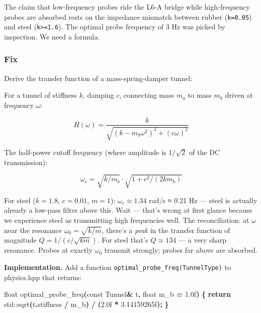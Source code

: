 \documentclass[
  11pt,
  a4paper,
]{article}
\newenvironment{Shaded}{\begin{snugshade}}{\end{snugshade}}
\newcommand{\AttributeTok}[1]{\textcolor[rgb]{0.13,0.29,0.53}{#1}}
\newcommand{\BuiltInTok}[1]{#1}
\newcommand{\ControlFlowTok}[1]{\textcolor[rgb]{0.13,0.29,0.53}{\textbf{#1}}}
\newcommand{\DataTypeTok}[1]{\textcolor[rgb]{0.13,0.29,0.53}{#1}}
\newcommand{\FloatTok}[1]{\textcolor[rgb]{0.00,0.00,0.81}{#1}}
\newcommand{\NormalTok}[1]{#1}
\newcommand{\OperatorTok}[1]{\textcolor[rgb]{0.81,0.36,0.00}{\textbf{#1}}}
\newcommand{\VariableTok}[1]{\textcolor[rgb]{0.00,0.00,0.00}{#1}}
\begin{document}
The claim that low-frequency probes ride the L6-A bridge while
high-frequency probes are absorbed rests on the impedance mismatch
between rubber (\texttt{k=0.05}) and steel
(\texttt{k\textgreater{}=1.6}). The optimal probe frequency of 3 Hz was
picked by inspection. We need a formula.

\subsubsection{Fix}\label{fix-4}

Derive the transfer function of a mass-spring-damper tunnel:

For a tunnel of stiffness \(k\), damping \(c\), connecting mass \(m_a\)
to mass \(m_b\) driven at frequency \(\omega\):

\[
H(\omega) = \frac{k}{\sqrt{(k - m_b \omega^2)^2 + (c\omega)^2}}
\]

The half-power cutoff frequency (where amplitude is \(1/\sqrt{2}\) of
the DC transmission):

\[
\omega_c = \sqrt{k/m_b} \cdot \sqrt{1 + c^2/(2 k m_b)}
\]

For steel (\(k=1.8\), \(c=0.01\), \(m=1\)): \(\omega_c \approx 1.34\)
rad/s ≈ 0.21 Hz --- steel is actually already a low-pass filter above
this. Wait --- that's wrong at first glance because we experience steel
as transmitting high frequencies well. The reconciliation: at \(\omega\)
near the resonance \(\omega_0 = \sqrt{k/m}\), there's a \emph{peak} in
the transfer function of magnitude \(Q = 1/(c/\sqrt{k m})\). For steel
that's \(Q \approx 134\) --- a very sharp resonance. Probes at exactly
\(\omega_0\) transmit strongly; probes far above are absorbed.

\textbf{Implementation.} Add a function
\texttt{optimal\_probe\_freq(TunnelType)} to physics.hpp that returns:

\begin{Shaded}
\begin{Highlighting}[]
\DataTypeTok{float}\NormalTok{ optimal\_probe\_freq}\OperatorTok{(}\AttributeTok{const}\NormalTok{ Tunnel}\OperatorTok{\&}\NormalTok{ t}\OperatorTok{,} \DataTypeTok{float} \VariableTok{m\_b} \OperatorTok{=} \FloatTok{1.0}\BuiltInTok{f}\OperatorTok{)} \OperatorTok{\{}
    \ControlFlowTok{return} \BuiltInTok{std::}\NormalTok{sqrt}\OperatorTok{(}\NormalTok{t}\OperatorTok{.}\NormalTok{stiffness }\OperatorTok{/} \VariableTok{m\_b}\OperatorTok{)} \OperatorTok{/} \OperatorTok{(}\FloatTok{2.0}\BuiltInTok{f} \OperatorTok{*} \FloatTok{3.14159265}\BuiltInTok{f}\OperatorTok{);}
\OperatorTok{\}}
\end{Highlighting}
\end{Shaded}
\end{document}
